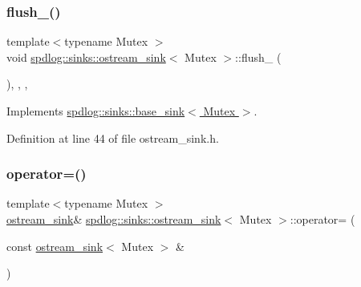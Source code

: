 \subsubsection{\texorpdfstring{flush\+\_\+()}{flush\_()}}
{\footnotesize\ttfamily template$<$typename Mutex $>$ \\
void \hyperlink{classspdlog_1_1sinks_1_1ostream__sink}{spdlog\+::sinks\+::ostream\+\_\+sink}$<$ Mutex $>$\+::flush\+\_\+ (\begin{DoxyParamCaption}{ }\end{DoxyParamCaption})\hspace{0.3cm}{\ttfamily [inline]}, {\ttfamily [override]}, {\ttfamily [protected]}, {\ttfamily [virtual]}}



Implements \hyperlink{classspdlog_1_1sinks_1_1base__sink_a5ac2b237c60f68a18122a1ca09b812b4}{spdlog\+::sinks\+::base\+\_\+sink$<$ Mutex $>$}.



Definition at line 44 of file ostream\+\_\+sink.\+h.

\mbox{\label{classspdlog_1_1sinks_1_1ostream__sink_a727591b2a4ca044848cacccfca4eb3af}} 
\subsubsection{\texorpdfstring{operator=()}{operator=()}}
{\footnotesize\ttfamily template$<$typename Mutex $>$ \\
\hyperlink{classspdlog_1_1sinks_1_1ostream__sink}{ostream\+\_\+sink}\& \hyperlink{classspdlog_1_1sinks_1_1ostream__sink}{spdlog\+::sinks\+::ostream\+\_\+sink}$<$ Mutex $>$\+::operator= (\begin{DoxyParamCaption}\item[{const \hyperlink{classspdlog_1_1sinks_1_1ostream__sink}{ostream\+\_\+sink}$<$ Mutex $>$ \&}]{ }\end{DoxyParamCaption})\hspace{0.3cm}{\ttfamily [delete]}}


